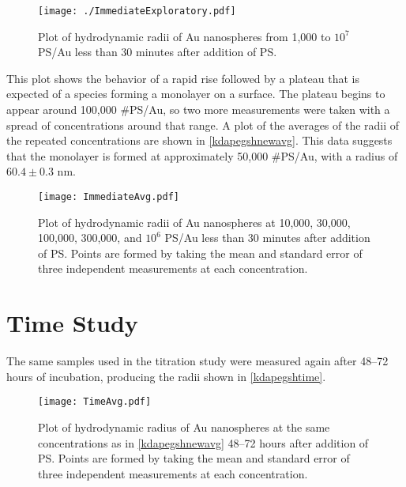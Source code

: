 \begin{figure}[htbp]
\centering
\texttt{[image: ./ImmediateExploratory.pdf]}
\caption{Plot of hydrodynamic radii of Au nanospheres from 1,000 to $10^7$ PS\slash Au less than 30 minutes after addition of PS.}
\label{kdapegshnewexpl}
\end{figure}



This plot shows the behavior of a rapid rise followed by a plateau that is expected of a species forming a monolayer on a surface. The plateau begins to appear around 100,000 \#PS\slash Au, so two more measurements were taken with a spread of concentrations around that range. A plot of the averages of the radii of the repeated concentrations are shown in \autoref{kdapegshnewavg}. This data suggests that the monolayer is formed at approximately 50,000 \#PS\slash Au, with a radius of $60.4\pm0.3$ nm.

\begin{figure}[htbp]
\centering
\texttt{[image: ImmediateAvg.pdf]}
\caption{Plot of hydrodynamic radii of Au nanospheres at 10,000, 30,000, 100,000, 300,000, and $10^6$ PS\slash Au less than 30 minutes after addition of PS. Points are formed by taking the mean and standard error of three independent measurements at each concentration.}
\label{kdapegshnewavg}
\end{figure}



\section{Time Study}
\label{timestudy}

The same samples used in the titration study were measured again after 48--72 hours of incubation, producing the radii shown in \autoref{kdapegshtime}.

\begin{figure}[htbp]
\centering
\texttt{[image: TimeAvg.pdf]}
\caption{Plot of hydrodynamic radius of Au nanospheres at the same concentrations as in \autoref{kdapegshnewavg} 48--72 hours after addition of PS. Points are formed by taking the mean and standard error of three independent measurements at each concentration.}
\label{kdapegshtime}
\end{figure}



